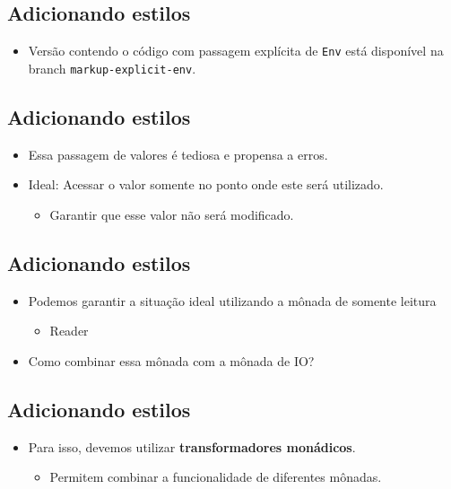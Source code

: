\documentclass[11pt]{article}
\begin{document}
\subsection*{Adicionando estilos}
\label{sec:orge904aa9}

\begin{itemize}
\item Versão contendo o código com passagem explícita de \texttt{Env} está disponível
na branch \texttt{markup-explicit-env}.
\end{itemize}
\subsection*{Adicionando estilos}
\label{sec:orgc34c931}

\begin{itemize}
\item Essa passagem de valores é tediosa e propensa a erros.

\item Ideal: Acessar o valor somente no ponto onde este será utilizado.
\begin{itemize}
\item Garantir que esse valor não será modificado.
\end{itemize}
\end{itemize}
\subsection*{Adicionando estilos}
\label{sec:orgba08e83}

\begin{itemize}
\item Podemos garantir a situação ideal utilizando a mônada de somente leitura
\begin{itemize}
\item Reader
\end{itemize}
\item Como combinar essa mônada com a mônada de IO?
\end{itemize}
\subsection*{Adicionando estilos}
\label{sec:orgd8ba349}

\begin{itemize}
\item Para isso, devemos utilizar \textbf{transformadores monádicos}.
\begin{itemize}
\item Permitem combinar a funcionalidade de diferentes mônadas.
\end{itemize}
\end{itemize}
\end{document}
